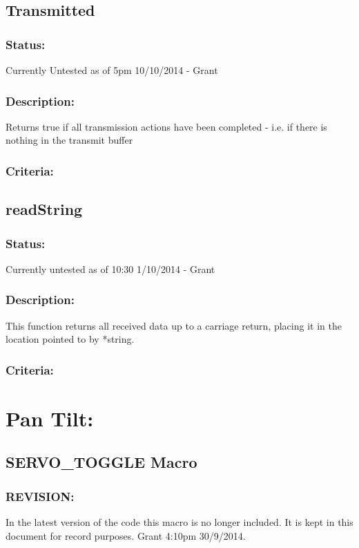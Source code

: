 \documentclass[]{report}
\begin{document}
\subsection{Transmitted}
\subsubsection{Status:}
Currently Untested as of 5pm 10/10/2014 - Grant

\subsubsection{Description:}
Returns true if all transmission actions have been completed - i.e. if there is nothing in the transmit buffer

\subsubsection{Criteria:}


\subsection{readString}
\subsubsection{Status:}
Currently untested as of 10:30 1/10/2014 - Grant

\subsubsection{Description:}
This function returns all received data up to a carriage return, placing it in the location pointed to by *string.

\subsubsection{Criteria:}

\section{Pan Tilt:}

\subsection{SERVO\_TOGGLE Macro}

\subsubsection{REVISION:}
In the latest version of the code this macro is no longer included. It is kept in this document for record purposes. Grant 4:10pm 30/9/2014.
\end{document}
